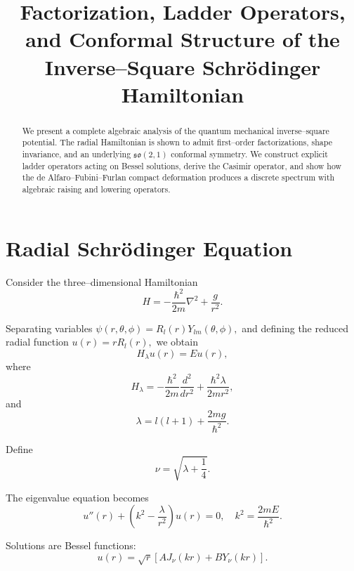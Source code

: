 \documentclass[11pt,a4paper]{article}
\title{\textbf{Factorization, Ladder Operators, and Conformal Structure of the Inverse–Square Schrödinger Hamiltonian}}
\author{}
\date{}
\begin{document}
\maketitle

\begin{abstract}
We present a complete algebraic analysis of the quantum mechanical
inverse–square potential.
The radial Hamiltonian is shown to admit first–order factorizations,
shape invariance, and an underlying $\mathfrak{so}(2,1)$ conformal symmetry.
We construct explicit ladder operators acting on Bessel solutions,
derive the Casimir operator, and show how the de Alfaro–Fubini–Furlan
compact deformation produces a discrete spectrum with algebraic raising
and lowering operators.
\end{abstract}

\section{Radial Schrödinger Equation}

Consider the three–dimensional Hamiltonian
\begin{equation}
H = -\frac{\hbar^2}{2m}\nabla^2 + \frac{g}{r^2}.
\end{equation}

Separating variables
\(
\psi(r,\theta,\phi)=R_l(r)Y_{lm}(\theta,\phi),
\)
and defining the reduced radial function
\(
u(r)=rR_l(r),
\)
we obtain
\begin{equation}
H_\lambda u(r)=Eu(r),
\end{equation}
where
\begin{equation}
H_\lambda
=
-\frac{\hbar^2}{2m}\frac{d^2}{dr^2}
+
\frac{\hbar^2\lambda}{2m r^2},
\end{equation}
and
\begin{equation}
\lambda
=
l(l+1)+\frac{2mg}{\hbar^2}.
\end{equation}

Define
\begin{equation}
\nu=\sqrt{\lambda+\frac14}.
\end{equation}

The eigenvalue equation becomes
\begin{equation}
u''(r)+\left(k^2-\frac{\lambda}{r^2}\right)u(r)=0,
\quad
k^2=\frac{2mE}{\hbar^2}.
\end{equation}

Solutions are Bessel functions:
\begin{equation}
u(r)=\sqrt{r}\left[
A J_\nu(kr)+B Y_\nu(kr)
\right].
\end{equation}
\end{document}
